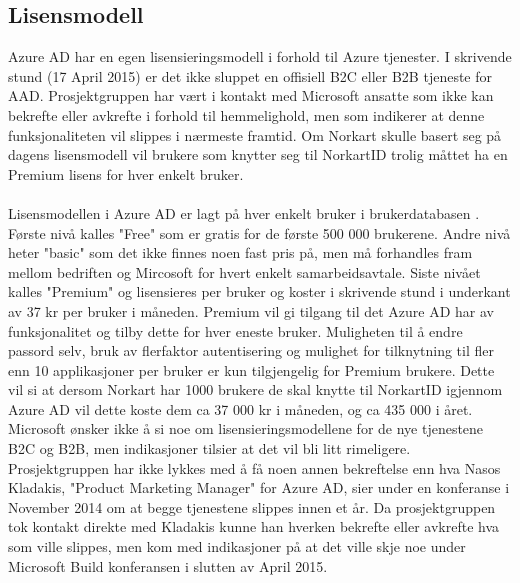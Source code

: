 \subsection{Lisensmodell}
\label{subsec:konfigurasjon_genrellHaandteringAvAad_lisensmodell}
Azure AD har en egen lisensieringsmodell i forhold til Azure tjenester. I skrivende stund (17 April 2015) er det ikke sluppet en offisiell B2C eller B2B tjeneste for AAD. Prosjektgruppen har vært i kontakt med Microsoft ansatte som ikke kan bekrefte eller avkrefte i forhold til hemmelighold, men som indikerer at denne funksjonaliteten vil slippes i nærmeste framtid. Om Norkart skulle basert seg på dagens lisensmodell vil brukere som knytter seg til NorkartID trolig måttet ha en Premium lisens for hver enkelt bruker. \\
\\
Lisensmodellen i Azure AD er lagt på hver enkelt bruker i brukerdatabasen \cite{AzureADPricing}. Første nivå kalles "Free" som er gratis for de første 500 000 brukerene. Andre nivå heter "basic" som det ikke finnes noen fast pris på, men må forhandles fram mellom bedriften og Mircosoft for hvert enkelt samarbeidsavtale. Siste nivået kalles "Premium" og lisensieres per bruker og koster i skrivende stund i underkant av 37 kr per bruker i måneden. Premium vil gi tilgang til det Azure AD har av funksjonalitet og tilby dette for hver eneste bruker. Muligheten til å endre passord selv, bruk av flerfaktor autentisering og mulighet for tilknytning til fler enn 10 applikasjoner per bruker er kun tilgjengelig for Premium brukere. Dette vil si at dersom Norkart har 1000 brukere de skal knytte til NorkartID igjennom Azure AD vil dette koste dem ca 37 000 kr i måneden, og ca 435 000 i året. Microsoft ønsker ikke å si noe om lisensieringsmodellene for de nye tjenestene B2C og B2B, men indikasjoner tilsier at det vil bli litt rimeligere. Prosjektgruppen har ikke lykkes med å få noen annen bekreftelse enn hva Nasos Kladakis, "Product Marketing Manager" for Azure AD, sier under en konferanse i November 2014 \cite{NasosAzureADExplained} om at begge tjenestene slippes innen et år. Da prosjektgruppen tok kontakt direkte med Kladakis kunne han hverken bekrefte eller avkrefte hva som ville slippes, men kom med indikasjoner på at det ville skje noe under Microsoft Build\cite{MicrosoftBildConference} konferansen i slutten av April 2015.

